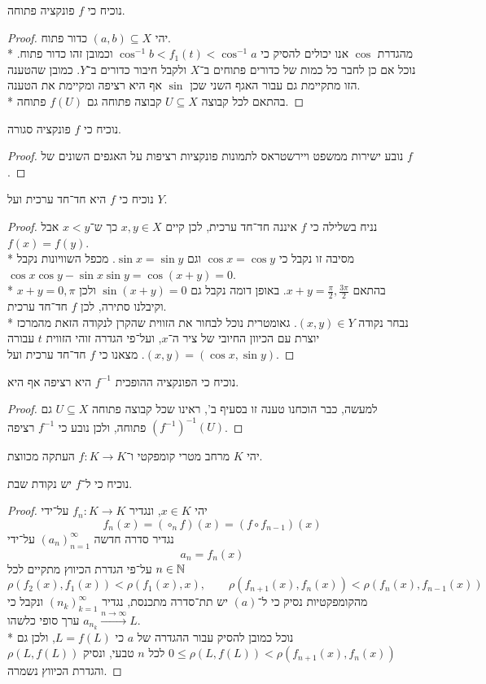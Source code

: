 \Subquestion{}
נוכיח כי $f$ פונקציה פתוחה.
\begin{proof}
	יהי $(a, b) \subseteq X$ כדור פתוח. \\*
	מהגדרת $\cos$ אנו יכולים להסיק כי $\cos^{-1} b < f_1(t) < \cos^{-1} a$ וכמובן זהו כדור פתוח. נוכל אם כן לחבר כל כמות של כדורים פתוחים ב־$X$ ולקבל חיבור כדורים ב־$Y$. 
	כמובן שהטענה הזו מתקיימת גם עבור האגף השני שכן $\sin$ אף היא רציפה ומקיימת את הטענה. \\*
	בהתאם לכל קבוצה $U \subseteq X$ קבוצה פתוחה גם $f(U)$ פתוחה.
\end{proof}

\Subquestion{}
נוכיח כי $f$ פונקציה סגורה.
\begin{proof}
	נובע ישירות ממשפט ויירשטראס לתמונות פונקציות רציפות על האגפים השונים של $f$.
\end{proof}

\Subquestion{}
נוכיח כי $f$ היא חד־חד ערכית ועל $Y$.
\begin{proof}
	נניח בשלילה כי $f$ איננה חד־חד ערכית, לכן קיים $x, y \in X$ כך ש־$x < y$ אבל $f(x) = f(y)$. \\*
	מסיבה זו נקבל כי $\cos x = \cos y$ וגם $\sin x = \sin y$. מכפל השוויונות נקבל $\cos x \cos y - \sin x \sin y = \cos(x + y) = 0$. \\*
	בהתאם $x + y = \frac{\pi}{2}, \frac{3 \pi}{2}$. באופן דומה נקבל גם $\sin(x + y) = 0$ ולכן $x + y = 0, \pi$ וקיבלנו סתירה, לכן $f$ חד־חד ערכית. \\*
	נבחר נקודה $(x, y) \in Y$. גאומטרית נוכל לבחור את הזווית שהקרן לנקודה הזאת מהמרכז יוצרת עם הכיוון החיובי של ציר ה־$x$, ועל־פי הגדרה זוהי הזווית $t$ עבורה $(x, y) = (\cos x, \sin y)$.
	מצאנו כי $f$ חד־חד ערכית ועל.
\end{proof}

\Subquestion{}
נוכיח כי הפונקציה ההופכית $f^{-1}$ היא רציפה אף היא.
\begin{proof}
	למעשה, כבר הוכחנו טענה זו בסעיף ב', ראינו שכל קבוצה פתוחה $U \subseteq X$ גם ${(f^{-1})}^{-1}(U)$ פתוחה, ולכן נובע כי $f^{-1}$ רציפה.
\end{proof}

\Question{}
יהי $K$ מרחב מטרי קומפקטי ו־$f : K \to K$ העתקה מכווצת.

\Subquestion{}
נוכיח כי ל־$f$ יש נקודת שבת.
\begin{proof}
	יהי $x \in K$, ונגדיר $f_n : K \to K$ על־ידי
	\[
		f_n(x) = (\circ_{n} f)(x) = (f \circ f_{n - 1})(x)
	\]
	נגדיר סדרה חדשה ${(a_n)}_{n = 1}^\infty$ על־ידי
	\[
		a_n = f_n(x)
	\]
	על־פי הגדרת הכיווץ מתקיים לכל $n \in \mathbb{N}$
	\[
		\rho(f_2(x), f_1(x)) < \rho(f_1(x), x), \qquad
		\rho(f_{n + 1}(x), f_n(x)) < \rho(f_{n}(x), f_{n - 1}(x))
	\]
	מהקומפקטיות נסיק כי ל־$(a)$ יש תת־סדרה מתכנסת, נגדיר ${(n_k)}_{k = 1}^\infty$ ונקבל כי $a_{n_k} \xrightarrow{n \to \infty} L$ ערך סופי כלשהו. \\*
	נוכל כמובן להסיק עבור ההגדרה של $a$ כי $L = f(L)$, ולכן גם $0 \le \rho(L, f(L)) < \rho(f_{n + 1}(x), f_n(x))$ לכל $n$ טבעי, ונסיק $\rho(L, f(L))$ והגדרת הכיווץ נשמרה.
\end{proof}

